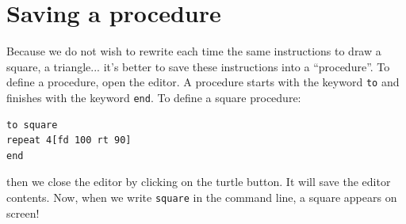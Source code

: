 \section{Saving a procedure}
\noindent Because we do not wish to rewrite each time the same instructions to draw a square, a triangle... it's better to save these instructions into a ``procedure''. To define a procedure, open the editor. A procedure starts with the keyword \texttt{to} and finishes with the keyword \texttt{end}. To define a square procedure:
\begin{verbatim}
to square
repeat 4[fd 100 rt 90]
end
\end{verbatim}
then we close the editor by clicking on the turtle button. It will save the editor contents. Now, when we write \texttt{square} in the command line, a square appears on screen!

